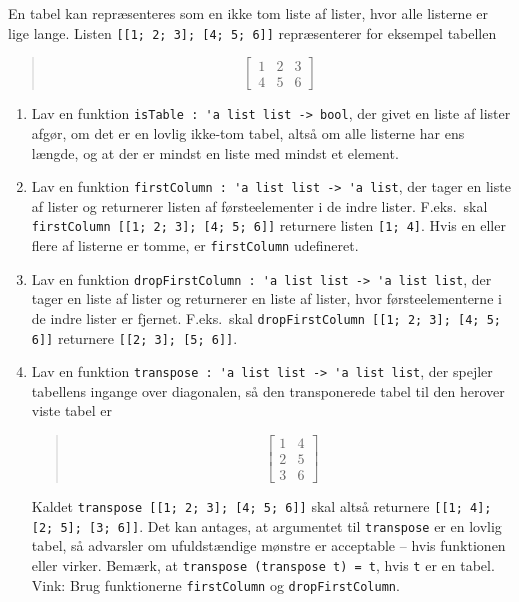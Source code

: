 En tabel kan repræsenteres som en ikke tom liste af lister, hvor alle listerne er lige lange. Listen \lstinline{[[1; 2; 3]; [4; 5; 6]]} repræsenterer for eksempel tabellen
  \begin{quote}
\[\left [\begin{array}{rrr}
1 & 2 & 3 \\
4 & 5 & 6
\end{array}
\right ]\]
\end{quote}
\begin{enumerate}
\item Lav en funktion \lstinline{isTable : 'a list list -> bool}, der givet en liste af lister afgør, om det er en lovlig ikke-tom tabel, altså om alle listerne har ens længde, og at der er mindst en liste med mindst et element.
\item Lav en funktion \lstinline{firstColumn : 'a list list -> 'a list}, der tager en liste af lister og returnerer listen af førsteelementer i de indre lister.  F.eks.\ skal \lstinline{firstColumn [[1; 2; 3]; [4; 5; 6]]} returnere listen \lstinline{[1; 4]}.  Hvis en eller flere af listerne er tomme, er \lstinline{firstColumn} udefineret.
\item Lav en funktion \lstinline{dropFirstColumn : 'a list list -> 'a list list}, der tager en liste af lister og returnerer en liste af lister, hvor førsteelementerne i de indre lister er fjernet.  F.eks.\ skal \lstinline{dropFirstColumn [[1; 2; 3]; [4; 5; 6]]} returnere \lstinline{[[2; 3]; [5; 6]]}.
\item Lav en funktion \lstinline{transpose : 'a list list -> 'a list list}, der spejler tabellens ingange over diagonalen, så den transponerede tabel til den herover viste tabel er
  \begin{quote}
\[\left [\begin{array}{rr}
1 & 4 \\
2 & 5 \\
3 & 6
\end{array}
\right ]\]
\end{quote}
Kaldet \lstinline{transpose [[1; 2; 3]; [4; 5; 6]]} skal altså returnere \lstinline{[[1; 4]; [2; 5]; [3; 6]]}.  Det kan antages, at argumentet til \lstinline{transpose} er en lovlig tabel, så advarsler om ufuldstændige mønstre er acceptable -- hvis funktionen eller virker.  Bemærk, at \lstinline{transpose (transpose t) = t}, hvis \lstinline{t} er en tabel.  Vink: Brug funktionerne \lstinline{firstColumn} og \lstinline{dropFirstColumn}.
\end{enumerate}
